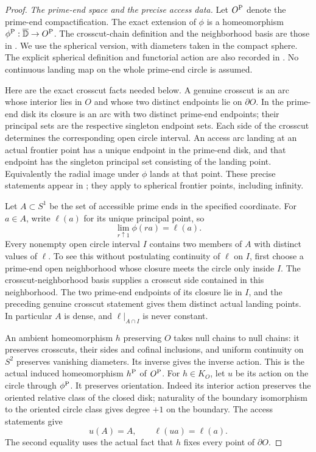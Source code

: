 \begin{proof}
\emph{The prime-end space and the precise access data.}
Let $O^{\rm P}$ denote the prime-end compactification.
The exact extension of $\phi$ is a homeomorphism
$\phi^{\rm P}:\overline{\mathbb D}\to O^{\rm P}$.
The crosscut-chain definition and the neighborhood
basis are those in
\cite[\S3.1]{C_BinderRojasYampolsky2014}.
We use the spherical version, with diameters taken
in the compact sphere. The explicit spherical
definition and functorial action are also recorded
in \cite[\S2, pp.~1571--1572]{C_OrtegaRuizDelPortal2011}.
No continuous landing map on the whole prime-end
circle is assumed.

Here are the exact crosscut facts needed below.
A genuine crosscut is an arc whose interior lies
in $O$ and whose two distinct endpoints lie on
$\partial O$. In the prime-end disk its closure
is an arc with two distinct prime-end endpoints;
their principal sets are the respective singleton
endpoint sets. Each side of the crosscut determines
the corresponding open circle interval.
An access arc landing at an actual frontier point
has a unique endpoint in the prime-end disk, and
that endpoint has the singleton principal set
consisting of the landing point. Equivalently the
radial image under $\phi$ lands at that point.
These precise statements appear in
\cite[p.~1575 and p.~1581, before the proof proper
of Lemma~7]{C_OrtegaRuizDelPortal2011}; they apply to
spherical frontier points, including infinity.

Let $A\subset S^1$ be the set of accessible prime
ends in the specified coordinate. For $a\in A$,
write $\ell(a)$ for its unique principal point,
so
\[
                  \lim_{r\uparrow1}\phi(ra)=\ell(a).
                                                               \tag{C.73.3}
\]
Every nonempty open circle interval $I$ contains
two members of $A$ with distinct values of $\ell$.
To see this without postulating continuity of
$\ell$ on $I$, first choose a prime-end open
neighborhood whose closure meets the circle
only inside $I$. The crosscut-neighborhood basis
supplies a crosscut side contained in this
neighborhood. The two prime-end endpoints of its
closure lie in $I$, and the preceding genuine
crosscut statement gives them distinct actual
landing points. In particular $A$ is dense,
and $\ell|_{A\cap I}$ is never constant.

An ambient homeomorphism $h$ preserving $O$
takes null chains to null chains: it preserves
crosscuts, their sides and cofinal inclusions,
and uniform continuity on $S^2$ preserves
vanishing diameters. Its inverse gives the
inverse action. This is the actual induced
homeomorphism $h^{\rm P}$ of $O^{\rm P}$.
For $h\in K_O$, let $u$ be its action on the
circle through $\phi^{\rm P}$. It preserves
orientation. Indeed its interior action preserves
the oriented relative class of the closed disk;
naturality of the boundary isomorphism to the
oriented circle class gives degree $+1$ on the
boundary. The access statements give
\[
                    u(A)=A,\qquad \ell(ua)=\ell(a).
                                                               \tag{C.73.4}
\]
The second equality uses the actual fact that
$h$ fixes every point of $\partial O$.


\end{proof}
